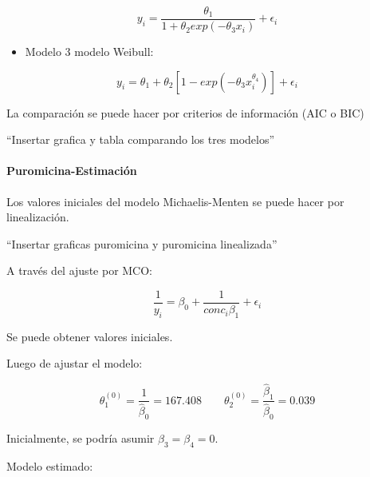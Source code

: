 \documentclass[
]{article}
\newenvironment{Shaded}{\begin{snugshade}}{\end{snugshade}}
\newcommand{\AttributeTok}[1]{\textcolor[rgb]{0.77,0.63,0.00}{#1}}
\newcommand{\DecValTok}[1]{\textcolor[rgb]{0.00,0.00,0.81}{#1}}
\newcommand{\FloatTok}[1]{\textcolor[rgb]{0.00,0.00,0.81}{#1}}
\newcommand{\FunctionTok}[1]{\textcolor[rgb]{0.00,0.00,0.00}{#1}}
\newcommand{\NormalTok}[1]{#1}
\newcommand{\OtherTok}[1]{\textcolor[rgb]{0.56,0.35,0.01}{#1}}
\newcommand{\SpecialCharTok}[1]{\textcolor[rgb]{0.00,0.00,0.00}{#1}}
\newcommand{\StringTok}[1]{\textcolor[rgb]{0.31,0.60,0.02}{#1}}
\providecommand{\tightlist}{%
  \setlength{\itemsep}{0pt}\setlength{\parskip}{0pt}}
\begin{document}
\[
y_{i}=\frac{\theta_{1}}{1+\theta_{2}exp(-\theta_{3}x_{i})}+\epsilon_{i}
\]

\begin{itemize}
\tightlist
\item
  Modelo 3 modelo Weibull:
\end{itemize}

\[
y_{i}=\theta_{1}+\theta_{2}[1-exp(-\theta_{3}x_{i}^{\theta_{4}})]+\epsilon_{i}
\]

La comparación se puede hacer por criterios de información (AIC o
BIC)

``Insertar grafica y tabla comparando los tres modelos''

\hypertarget{puromicina-estimaciuxf3n}{%
\paragraph{Puromicina-Estimación}\label{puromicina-estimaciuxf3n}}

Los valores iniciales del modelo Michaelis-Menten se puede hacer por linealización.

``Insertar graficas puromicina y puromicina linealizada''

A través del ajuste por MCO:

\[
\frac{1}{y_{i}}=\beta_{0}+\frac{1}{conc_{i}\beta_{1}}+\epsilon_{i}
\]

Se puede obtener valores iniciales.

Luego de ajustar el modelo:

\[
\theta_{1}^{(0)}=\frac{1}{\hat{\beta}_{0}}=167.408 \qquad \theta_{2}^{(0)}=\frac{\hat{\beta}_{1}}{\hat{\beta}_{0}}=0.039
\]

Inicialmente, se podría asumir \(\beta_{3}=\beta_{4}=0.\)

Modelo estimado:

\begin{Shaded}
\end{Shaded}
\end{document}
